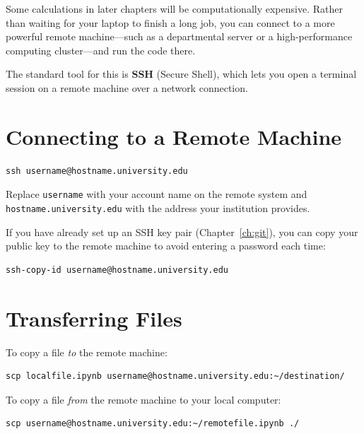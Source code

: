 \documentclass[nobib]{tufte-book}
\begin{document}
Some calculations in later chapters will be computationally expensive.
Rather than waiting for your laptop to finish a long job, you can connect
to a more powerful remote machine---such as a departmental server or a
high-performance computing cluster---and run the code there.

The standard tool for this is \textbf{SSH} (Secure Shell), which lets you
open a terminal session on a remote machine over a network connection.

\section{Connecting to a Remote Machine}

\begin{lstlisting}[style=bashstyle]
ssh username@hostname.university.edu
\end{lstlisting}

Replace \texttt{username} with your account name on the remote system and
\texttt{hostname.university.edu} with the address your institution provides.

If you have already set up an SSH key pair (Chapter~\ref{ch:git}), you can
copy your public key to the remote machine to avoid entering a password
each time:

\begin{lstlisting}[style=bashstyle]
ssh-copy-id username@hostname.university.edu
\end{lstlisting}

\section{Transferring Files}

To copy a file \emph{to} the remote machine:

\begin{lstlisting}[style=bashstyle]
scp localfile.ipynb username@hostname.university.edu:~/destination/
\end{lstlisting}

To copy a file \emph{from} the remote machine to your local computer:

\begin{lstlisting}[style=bashstyle]
scp username@hostname.university.edu:~/remotefile.ipynb ./
\end{lstlisting}
\end{document}
